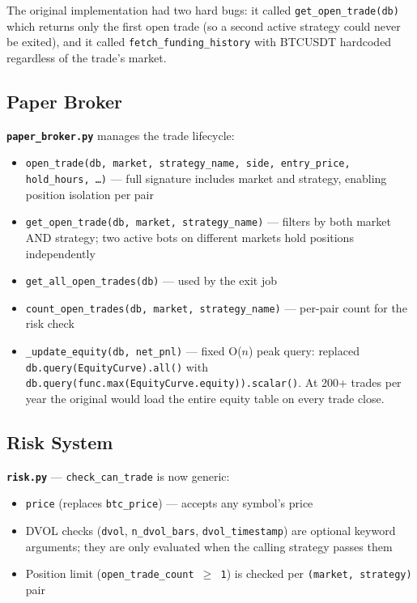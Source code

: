 \documentclass[11pt,a4paper]{article}
\newcommand{\code}[1]{\texttt{#1}}
\begin{document}
The original implementation had two hard bugs: it called \code{get\_open\_trade(db)} which returns only the first open trade (so a second active strategy could never be exited), and it called \code{fetch\_funding\_history} with BTCUSDT hardcoded regardless of the trade's market.

\subsection{Paper Broker}

\textbf{\code{paper\_broker.py}} manages the trade lifecycle:

\begin{itemize}[noitemsep]
  \item \code{open\_trade(db, market, strategy\_name, side, entry\_price, hold\_hours, \ldots)} --- full signature includes market and strategy, enabling position isolation per pair
  \item \code{get\_open\_trade(db, market, strategy\_name)} --- filters by both market AND strategy; two active bots on different markets hold positions independently
  \item \code{get\_all\_open\_trades(db)} --- used by the exit job
  \item \code{count\_open\_trades(db, market, strategy\_name)} --- per-pair count for the risk check
  \item \code{\_update\_equity(db, net\_pnl)} --- fixed O($n$) peak query: replaced \code{db.query(EquityCurve).all()} with \code{db.query(func.max(EquityCurve.equity)).scalar()}. At 200+ trades per year the original would load the entire equity table on every trade close.
\end{itemize}

\subsection{Risk System}

\textbf{\code{risk.py}} --- \code{check\_can\_trade} is now generic:
\begin{itemize}[noitemsep]
  \item \code{price} (replaces \code{btc\_price}) --- accepts any symbol's price
  \item DVOL checks (\code{dvol}, \code{n\_dvol\_bars}, \code{dvol\_timestamp}) are optional keyword arguments; they are only evaluated when the calling strategy passes them
  \item Position limit (\code{open\_trade\_count $\geq$ 1}) is checked per \code{(market, strategy)} pair
\end{itemize}
\end{document}
